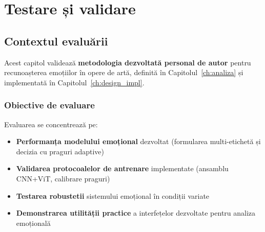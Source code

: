 \chapter{Testare și validare}
\label{ch:testare-validare}


\section*{Contextul evaluării}
Acest capitol validează \textbf{metodologia dezvoltată personal de autor} pentru recunoașterea emoțiilor în opere de artă, definită în Capitolul~\ref{ch:analiza} și implementată în Capitolul~\ref{ch:design_impl}.

\subsection*{Obiective de evaluare}
Evaluarea se concentrează pe:
\begin{itemize}
    \item \textbf{Performanța modelului emoțional} dezvoltat (formularea multi-etichetă și decizia cu praguri adaptive)
    \item \textbf{Validarea protocoalelor de antrenare} implementate (ansamblu CNN+ViT, calibrare praguri)
    \item \textbf{Testarea robustetii} sistemului emoțional în condiții variate
    \item \textbf{Demonstrarea utilității practice} a interfețelor dezvoltate pentru analiza emoțională
\end{itemize}

